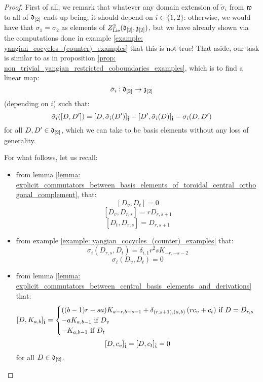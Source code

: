             \begin{proof}
                First of all, we remark that whatever any domain extension of $\tilde{\sigma}_i$ from $\mathfrak{w}$ to all of $\mathfrak{d}_{[2]}$ ends up being, it should depend on $i \in \{1, 2\}$: otherwise, we would have that $\sigma_1 = \sigma_2$ as elements of $Z^2_{\mathrm{Lie}}(\mathfrak{d}_{[2]}, \mathfrak{z}_{[2]})$, but we have already shown via the computations done in example \ref{example: yangian_cocycles_(counter)_examples} that this is not true! That aside, our task is similar to as in proposition \ref{prop: non_trivial_yangian_restricted_coboundaries_examples}, which is to find a linear map:
                    $$\tilde{\sigma}_i: \mathfrak{d}_{[2]} \to \mathfrak{z}_{[2]}$$
                (depending on $i$) such that:
                    $$\tilde{\sigma}_i([D, D']) = [D, \tilde{\sigma}_i(D')]_{\hat{\mathfrak{t}}} - [D', \tilde{\sigma}_i(D)]_{\hat{\mathfrak{t}}} - \sigma_i(D, D')$$
                for all $D, D' \in \mathfrak{d}_{[2]}$, which we can take to be basis elements without any loss of generality.

                For what follows, let us recall:
                \begin{itemize}
                    \item from lemma \ref{lemma: explicit_commutators_between_basis_elements_of_toroidal_central_orthogonal_complement}, that:
                        $$[D_v, D_t] = 0$$
                        $$[D_v, D_{r, s}] = r D_{r, s + 1}$$
                        $$[D_t, D_{r, s}] = D_{r, s + 1}$$
                    \item from example \ref{example: yangian_cocycles_(counter)_examples} that:
                        $$\sigma_i(D_{r, s}, D_t) = \delta_{i, 1} r^2 s K_{-r, -s - 2}$$
                        $$\sigma_i(D_v, D_t) = 0$$
                    \item from lemma \ref{lemma: explicit_commutators_between_central_basis_elements_and_derivations} that:
                        $$
                            [D, K_{a, b}]_{\hat{\mathfrak{t}}} =
                            \begin{cases}
                                \text{$((b - 1)r - sa) K_{a - r, b - s - 1} + \delta_{(r, s + 1), (a, b)} \left( r c_v + c_t \right)$ if $D = D_{r, s}$}
                                \\
                                \text{$-a K_{a, b - 1}$ if $D_v$}
                                \\
                                \text{$-K_{a, b - 1}$ if $D_t$}
                            \end{cases}
                        $$
                        $$[D, c_v]_{\hat{\mathfrak{t}}} = [D, c_t]_{\hat{\mathfrak{t}}} = 0$$
                    for all $D \in \mathfrak{d}_{[2]}$.
                \end{itemize}


\end{proof}
